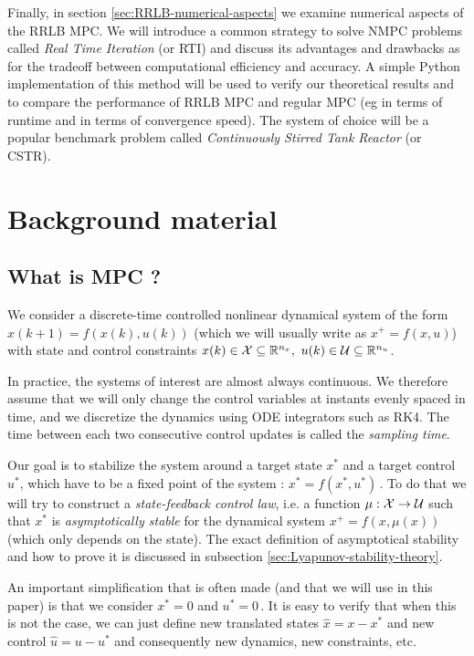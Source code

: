 \documentclass[12pt]{article}
\begin{document}
Finally, in section \ref{sec:RRLB-numerical-aspects} we examine numerical aspects of the RRLB MPC.
We will introduce a common strategy to solve NMPC problems called \textit{Real Time Iteration} (or RTI) and discuss its advantages and drawbacks as for the tradeoff between computational efficiency and accuracy.
A simple Python implementation of this method will be used to verify our theoretical results and to compare the performance of RRLB MPC and regular MPC (eg in terms of runtime and in terms of convergence speed).
The system of choice will be a popular benchmark problem called \textit{Continuously Stirred Tank Reactor} (or CSTR).

\section{Background material}\label{sec:background-material}

\subsection{What is MPC ?}\label{sec:what-is-MPC}

We consider a discrete-time controlled nonlinear dynamical system of the form $x(k+1)=f(x(k), u(k))$ (which we will usually write as $x^+=f(x,u)$) with state and control constraints $x(k)\in\cal{X}\subseteq\R^{n_x},~u(k)\in\cal{U}\subseteq\R^{n_u}$.

In practice, the systems of interest are almost always continuous. We therefore assume that we will only change the control variables at instants evenly spaced in time, and we discretize the dynamics using ODE integrators such as RK4. The time between each two consecutive control updates is called the \textit{sampling time}.

Our goal is to stabilize the system around a target state $x^*$ and a target control $u^*$, which have to be a fixed point of the system : $x^*=f(x^*, u^*)$\,.
To do that we will try to construct a \textit{state-feedback control law}, i.e. a function $\mu:\cal{X}\to\cal{U}$ such that $x^*$ is \textit{asymptotically stable} for the dynamical system $x^+=f(x,\mu(x))$ (which only depends on the state).
The exact definition of asymptotical stability and how to prove it is discussed in subsection \ref{sec:Lyapunov-stability-theory}.

An important simplification that is often made (and that we will use in this paper) is that we consider $x^*=0$ and $u^*=0$\,.
It is easy to verify that when this is not the case, we can just define new translated states $\hat{x}=x-x^*$ and new control $\hat{u}=u-u^*$ and consequently new dynamics, new constraints, etc.
\end{document}
